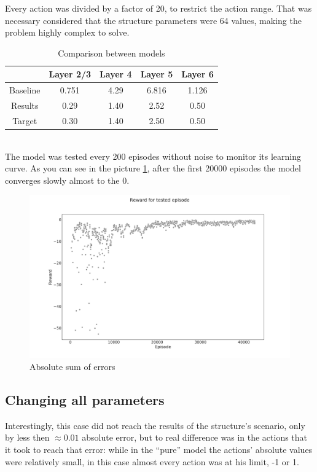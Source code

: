Every action was divided by a factor of 20, to restrict the action range. That was necessary considered that the structure parameters were 64 values, making the problem highly complex to solve.
\begin{table}[htbp]
	\begin{center} \vspace{5pt} \setlength{\arrayrulewidth}{0.3mm}
			\begin{tabular}{|c | c c c c|} 
				\hline
                         & Layer 2/3 & Layer 4 & Layer 5 & Layer 6 \\ [0.5ex]
				\hline
				Baseline & 0.751     & 4.29    & 6.816   & 1.126   \\
				\hline
				Results  & 0.29      & 1.40    & 2.52    & 0.50    \\
				\hline
				Target   & 0.30      & 1.40    & 2.50    & 0.50    \\
				\hline
			\end{tabular}
		\caption{Comparison between models}
	\end{center}
\end{table}
\\ The model was tested every 200 episodes without noise to monitor its learning curve. As you can see in the picture \ref{fig:structure}, after the first 20000 episodes the model converges slowly almost to the 0.
\begin{figure}[htbp]
	\centering
	\includegraphics[scale=0.4]{pictures/structure_scatterplot.pdf}
	\caption{Absolute sum of errors}
	\label{fig:structure}
\end{figure}

\subsection{Changing all parameters} 
Interestingly, this case did not reach the results of the structure's scenario, only by less then $\approx 0.01$ absolute error, but to real difference was in the actions that it took to reach that error: while in the ``pure'' model the actions' absolute values were relatively small, in this case almost every action was at his limit, -1 or 1.

